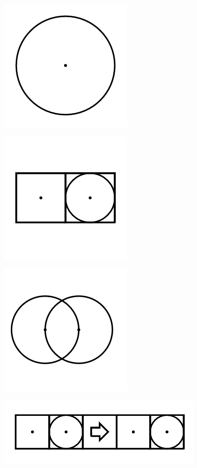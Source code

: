\documentclass[11pt]{article}
\begin{document}
\begin{figure}
\includegraphics[scale=0.3]{image1.png}
\end{figure}
\begin{figure}
\includegraphics[scale=0.3]{image2.png}
\end{figure}

\begin{figure}
\includegraphics[scale=0.3]{image3.png}
\end{figure}
\begin{figure}
\includegraphics[scale=0.3]{image4.png}
\end{figure}
\end{document}
